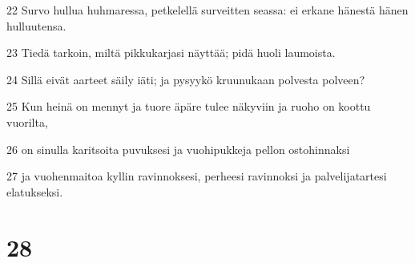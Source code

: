 \par 22 Survo hullua huhmaressa, petkelellä surveitten seassa: ei erkane hänestä hänen hulluutensa.
\par 23 Tiedä tarkoin, miltä pikkukarjasi näyttää; pidä huoli laumoista.
\par 24 Sillä eivät aarteet säily iäti; ja pysyykö kruunukaan polvesta polveen?
\par 25 Kun heinä on mennyt ja tuore äpäre tulee näkyviin ja ruoho on koottu vuorilta,
\par 26 on sinulla karitsoita puvuksesi ja vuohipukkeja pellon ostohinnaksi
\par 27 ja vuohenmaitoa kyllin ravinnoksesi, perheesi ravinnoksi ja palvelijatartesi elatukseksi.

\chapter{28}

